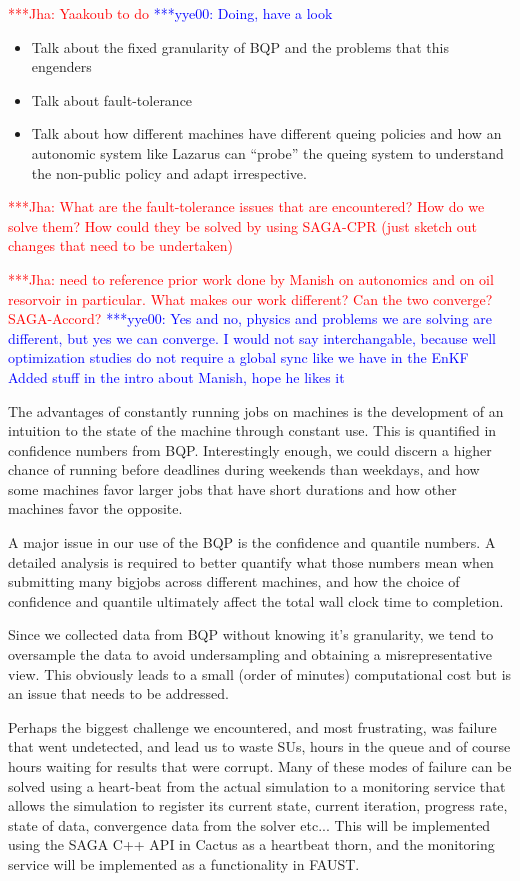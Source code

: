 \documentclass[conference,final]{IEEEtran}
\newcommand{\jhanote}[1]{ {\textcolor{red} { ***Jha: #1 }}}
\newcommand{\yyenote}[1]{ {\textcolor{blue} { ***yye00: #1 }}}
\newcommand{\jhanote}[1]{}
\newcommand{\yyenote}[1]{}
\begin{document}
\jhanote{Yaakoub to do}
\yyenote{Doing, have a look}

\begin{itemize}
\item Talk about the fixed granularity of BQP and the problems that this
engenders
\item Talk about fault-tolerance
\item Talk about how different machines have different queing policies
  and how an autonomic system like Lazarus can ``probe'' the queing
  system to understand the non-public policy and adapt irrespective.
\end{itemize}


\jhanote{What are the fault-tolerance issues that are encountered?
  How do we solve them? How could they be solved by using SAGA-CPR
  (just sketch out changes that need to be undertaken)}

\jhanote{need to reference prior work done by Manish on autonomics and
  on oil resorvoir in particular. What makes our work different?  Can
  the two converge? SAGA-Accord?}
\yyenote{Yes and no, physics and problems we are solving are different, 
but yes we can converge. I would not say interchangable, because well 
optimization studies do not require a global sync like we have in the EnKF
Added stuff in the intro about Manish, hope he likes it}  

The advantages of constantly running jobs on machines is the
development of an intuition to the state of the machine through
constant use. This is quantified in confidence numbers from
BQP. Interestingly enough, we could discern a higher chance of running
before deadlines during weekends than weekdays, and how some machines
favor larger jobs that have short durations and how other machines
favor the opposite.

A major issue in our use of the BQP is the confidence and quantile
numbers. A detailed analysis is required to better quantify what those
numbers mean when submitting many bigjobs across different machines,
and how the choice of confidence and quantile ultimately affect the
total wall clock time to completion.

Since we collected data from BQP without knowing it's granularity, we
tend to oversample the data to avoid undersampling and obtaining a
misrepresentative view.  This obviously leads to a small (order of
minutes) computational cost but is an issue that needs to be
addressed.

Perhaps the biggest challenge we encountered, and most frustrating,
was failure that went undetected, and lead us to waste SUs, hours in
the queue and of course hours waiting for results that were
corrupt. Many of these modes of failure can be solved using a
heart-beat from the actual simulation to a monitoring service that
allows the simulation to register its current state, current
iteration, progress rate, state of data, convergence data from the
solver etc... This will be implemented using the SAGA C++ API in
Cactus as a heartbeat thorn, and the monitoring service will be
implemented as a functionality in FAUST.
\end{document}
